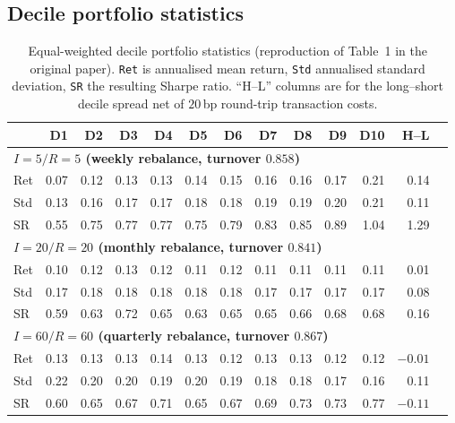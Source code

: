 \documentclass{article}
\begin{document}
\subsection{Decile portfolio statistics}

\begin{table}[H]
  \centering
  \caption{Equal-weighted decile portfolio statistics (reproduction of
    Table~1 in the original paper).
    \texttt{Ret} is annualised mean return, \texttt{Std} annualised standard
    deviation, \texttt{SR} the resulting Sharpe ratio. ``H--L'' columns
    are for the long--short decile spread net of $20$\,bp round-trip
    transaction costs.}
  \label{tab:table2}
  \small
  \begin{tabular}{l rrrrrrrrrrr r}
    \toprule
       & D1 & D2 & D3 & D4 & D5 & D6 & D7 & D8 & D9 & D10 & H--L \\
    \midrule
    \multicolumn{12}{l}{\textbf{$I=5 / R=5 $ (weekly rebalance, turnover $0.858$)}}\\
    Ret & 0.07 & 0.12 & 0.13 & 0.13 & 0.14 & 0.15 & 0.16 & 0.16 & 0.17 & 0.21 & 0.14 \\
    Std & 0.13 & 0.16 & 0.17 & 0.17 & 0.18 & 0.18 & 0.19 & 0.19 & 0.20 & 0.21 & 0.11 \\
    SR  & 0.55 & 0.75 & 0.77 & 0.77 & 0.75 & 0.79 & 0.83 & 0.85 & 0.89 & 1.04 & 1.29 \\
    \midrule
    \multicolumn{12}{l}{\textbf{$I=20 / R=20 $ (monthly rebalance, turnover $0.841$)}}\\
    Ret & 0.10 & 0.12 & 0.13 & 0.12 & 0.11 & 0.12 & 0.11 & 0.11 & 0.11 & 0.11 & 0.01 \\
    Std & 0.17 & 0.18 & 0.18 & 0.18 & 0.18 & 0.18 & 0.17 & 0.17 & 0.17 & 0.17 & 0.08 \\
    SR  & 0.59 & 0.63 & 0.72 & 0.65 & 0.63 & 0.65 & 0.65 & 0.66 & 0.68 & 0.68 & 0.16 \\
    \midrule
    \multicolumn{12}{l}{\textbf{$I=60 / R=60 $ (quarterly rebalance, turnover $0.867$)}}\\
    Ret & 0.13 & 0.13 & 0.13 & 0.14 & 0.13 & 0.12 & 0.13 & 0.13 & 0.12 & 0.12 & $-0.01$ \\
    Std & 0.22 & 0.20 & 0.20 & 0.19 & 0.20 & 0.19 & 0.18 & 0.18 & 0.17 & 0.16 & 0.11 \\
    SR  & 0.60 & 0.65 & 0.67 & 0.71 & 0.65 & 0.67 & 0.69 & 0.73 & 0.73 & 0.77 & $-0.11$ \\
    \bottomrule
  \end{tabular}
\end{table}
\end{document}
